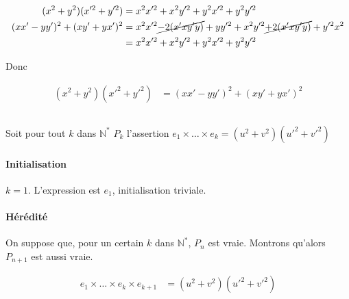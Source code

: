 \documentclass{article}
\newcommand{\N}{\mathds{N}}
\begin{document}
\subsection{}

\begin{align*}
	(x^2+y^2)(x'^2+y'^2)&= x^2x'^2+x^2y'^2+y^2x'^2+y^2y'^2 \\
	(x x' - yy')^2+(xy'+yx')^2 &= x^2x'^2\cancel{-2(x'xy'y)}+yy'^2+x^2y'^2\cancel{+2(x'xy'y)}+y'^2x^2 \\
	&= x^2x'^2+x^2y'^2+y^2x'^2+y^2y'^2 \\
\end{align*}

Donc

\begin{align*}
	(x^2+y^2)(x'^2+y'^2)&=(x x' - yy')^2+(xy'+yx')^2
\end{align*}

\subsection{}

Soit pour tout $k$ dans $\N^{\ast}$ $P_k$ l'assertion $e_1 \times \ldots \times e_k = (u^2+v^2)(u'^2+v'^2)$

\paragraph{Initialisation} $k=1$. L'expression est $e_1$, initialisation triviale.

\paragraph{Hérédité} On suppose que, pour un certain $k$ dans $\N^\ast$, $P_n$ est vraie. Montrons qu'alors $P_{n+1}$ est aussi vraie.

\begin{align*}
	e_1 \times \ldots \times e_k \times e_{k+1} &= (u^2+v^2)(u'^2+v'^2) \\
\end{align*}



\end{document}
